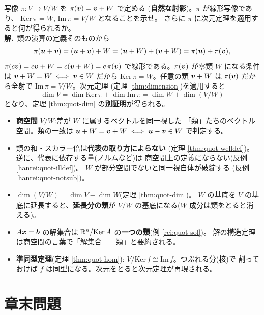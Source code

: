 \begin{rei}[例題・標準(証明:自然な射影)]\label{rei:quot-proj}
写像 $\pi : V \to V/W$ を $\pi(\bm{v}) = \bm{v} + W$ で定める
(\textbf{自然な射影})。$\pi$ が線形写像であり、
$\mathrm{Ker}\,\pi = W$, $\mathrm{Im}\,\pi = V/W$ となることを示せ。
さらに $\pi$ に次元定理を適用すると何が得られるか。\\
\textbf{解.}\ 類の演算の定義そのものから
\[
\pi(\bm{u} + \bm{v}) = (\bm{u} + \bm{v}) + W
= (\bm{u} + W) + (\bm{v} + W) = \pi(\bm{u}) + \pi(\bm{v}),
\]
$\pi(c\bm{v}) = c\bm{v} + W = c(\bm{v} + W) = c\,\pi(\bm{v})$
で線形である。$\pi(\bm{v})$ が零類 $W$ になる条件は
$\bm{v} + W = W \iff \bm{v} \in W$ だから
$\mathrm{Ker}\,\pi = W$。任意の類 $\bm{v} + W$ は $\pi(\bm{v})$
だから全射で $\mathrm{Im}\,\pi = V/W$。次元定理
(定理 \ref{thm:dimension})を適用すると
\[
\dim V = \dim \mathrm{Ker}\,\pi + \dim \mathrm{Im}\,\pi
= \dim W + \dim(V/W)
\]
となり、定理 \ref{thm:quot-dim} の\textbf{別証明}が得られる。
\end{rei}

\begin{matome}
\begin{itemize}
\item \textbf{商空間} $V/W$:差が $W$ に属するベクトルを同一視した
「類」たちのベクトル空間。類の一致は
$\bm{u} + W = \bm{v} + W \iff \bm{u} - \bm{v} \in W$ で判定する。
\item 類の和・スカラー倍は\textbf{代表の取り方によらない}
(定理 \ref{thm:quot-welldef})。逆に、代表に依存する量(ノルムなど)は
商空間上の定義にならない(反例 \ref{hanrei:quot-illdef})。
$W$ が部分空間でないと同一視自体が破綻する
(反例 \ref{hanrei:quot-notsub})。
\item $\dim(V/W) = \dim V - \dim W$(定理 \ref{thm:quot-dim})。
$W$ の基底を $V$ の基底に延長すると、\textbf{延長分の類}が
$V/W$ の基底になる($W$ 成分は類をとると消える)。
\item $A\bm{x} = \bm{b}$ の解集合は
$\mathbb{R}^n/\mathrm{Ker}\,A$ の\textbf{一つの類}(例 \ref{rei:quot-sol})。
解の構造定理は商空間の言葉で「解集合 $=$ 類」と要約される。
\item \textbf{準同型定理}(定理 \ref{thm:quot-hom}):
$V/\mathrm{Ker}\,f \cong \mathrm{Im}\,f$。つぶれる分(核)で
割っておけば $f$ は同型になる。次元をとると次元定理が再現される。
\end{itemize}
\end{matome}

\section*{章末問題}

